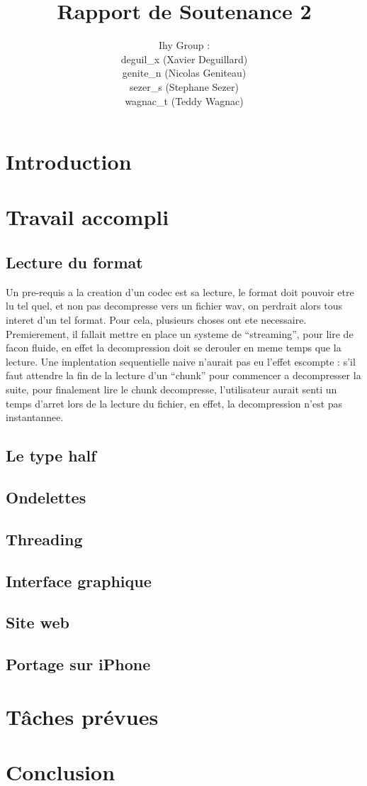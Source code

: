 \documentclass[a4paper,12pt]{article}
\title{Rapport de Soutenance 2}
\author{
Ihy Group : \\
deguil\_x (Xavier Deguillard)\\
genite\_n (Nicolas Geniteau)\\
sezer\_s (Stephane Sezer)\\
wagnac\_t (Teddy Wagnac)
}
\begin{document}
\maketitle

\newpage

\section*{Introduction}

\newpage

\tableofcontents

\newpage

\section{Travail accompli}
	\subsection{Lecture du format}
Un pre-requis a la creation d'un codec est sa lecture, le format doit
pouvoir etre lu tel quel, et non pas decompresse vers un fichier wav, on
perdrait alors tous interet d'un tel format. Pour cela, plusieurs choses
ont ete necessaire. Premierement, il fallait mettre en place un systeme
de ``streaming'', pour lire de facon fluide, en effet la decompression
doit se derouler en meme temps que la lecture. Une implentation
sequentielle naive n'aurait pas eu l'effet escompte : s'il faut attendre
la fin de la lecture d'un ``chunk'' pour commencer a decompresser la
suite, pour finalement lire le chunk decompresse, l'utilisateur aurait
senti un temps d'arret lors de la lecture du fichier, en effet, la
decompression n'est pas instantannee.\\
	\subsection{Le type half}
	\subsection{Ondelettes}
	\subsection{Threading}
	\subsection{Interface graphique}
	\subsection{Site web}
	\subsection{Portage sur iPhone}

\newpage

\section{Tâches prévues}

\newpage

\section*{Conclusion}
\end{document}

